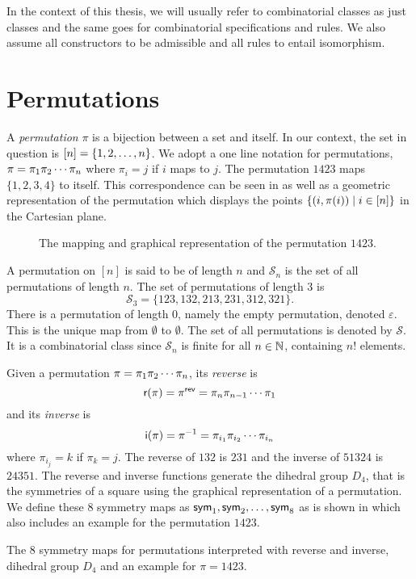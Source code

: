 In the context of this thesis, we will usually refer to combinatorial classes as just classes and the same goes for combinatorial specifications and rules. We also assume all constructors to be admissible and all rules to entail isomorphism. 

\section{Permutations\label{sec:permutations}}
A \emph{permutation} $\pi$ is a bijection between a set and itself. In our context, the set in question is $[n] = \left\{1,2,\dotsc,n\right\}$. We adopt a one line notation for permutations, $\pi = \pi_1 \pi_2 \dotsm \pi_{n}$ where $\pi_i = j$ if $i$ maps to $j$. The permutation $1423$ maps $\{1,2,3,4\}$ to itself. This correspondence can be seen in  as well as a geometric representation of the permutation which displays the points $\left\{(i,\pi(i)) \mid i \in [n]\right\}$ in the Cartesian plane.

\begin{figure}[ht!]
    \centering
    
    \caption{The mapping and graphical representation of the permutation $1423$.}
    \label{fig:perm_example}
\end{figure}

A permutation on $[n]$ is said to be of length $n$ and $\mathcal{S}_n$ is the set of all permutations of length $n$. The set of permutations of length 3 is 
\[
    \mathcal{S}_3 = \{123,132,213,231,312,321\}.
\]
There is a permutation of length $0$, namely the empty permutation, denoted $\varepsilon$. This is the unique map from $\emptyset$ to $\emptyset$. The set of all permutations is denoted by $\mathcal{S}$. It is a combinatorial class since $\mathcal{S}_n$ is finite for all $n\in\mathbb{N}$, containing $n!$ elements.

Given a permutation $\pi = \pi_1 \pi_2 \dotsm \pi_{n}$, its \emph{reverse} is
\[
    \textsf{r}(\pi) = \pi^\textsf{rev} = \pi_{n} \pi_{n - 1} \dotsm \pi_1
\]
and its \emph{inverse} is
\[
    \textsf{i}(\pi) = \pi^{-1} = \pi_{i_1} \pi_{i_2} \dotsm \pi_{i_{n}}
\]
where $\pi_{i_j} = k$ if $\pi_k = j$. The reverse of $132$ is $231$ and the inverse of $51324$ is $24351$. The reverse and inverse functions generate the dihedral group $D_4$, that is the symmetries of a square using the graphical representation of a permutation. We define these 8 symmetry maps as $\textsf{sym}_1,\textsf{sym}_2,\dotsc,\textsf{sym}_8$ as is shown in  which also includes an example for the permutation $1423$.

\begin{table}[ht!]
    \centering
    
    \caption{The 8 symmetry maps for permutations interpreted with reverse and inverse, dihedral group $D_4$ and an example for $\pi=1423$.}
    \label{tab:permsym}
\end{table}

